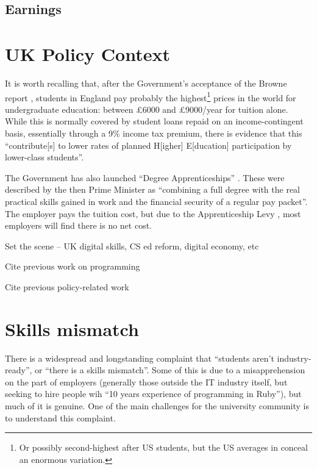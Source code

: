 \documentclass[sigconf]{acmart}
\begin{document}
\subsection{Earnings}

\section{UK Policy Context}
It is worth recalling that, after the Government's acceptance of the Browne report \cite{BIS2010a}, students in England pay probably the highest\footnote{Or possibly second-highest after US students, but the US averages in \cite[Table B5.1]{OECD2016a} conceal an enormous variation.} prices in the world for undergraduate education: between \pounds6000 and \pounds9000/year for tuition alone. While this is normally covered by student loans repaid on an income-contingent basis, essentially through a 9\% income tax premium, there is evidence \cite{CallenderMason2017a} that this ``contribute[s] to lower rates of planned H[igher] E[ducation] participation by lower-class students''.

The Government has also launched ``Degree Apprenticeships'' \cite{BIS2015a}. These were described by the then Prime Minister as ``combining a full degree with the real practical skills gained in work and the financial security of a regular pay packet''. The employer pays the tuition cost, but due to the Apprenticeship Levy \cite{HMRC2016a}, most employers will find there is no net cost.

Set the scene -- UK digital skills, CS ed reform, digital economy, etc

Cite previous work on programming~\cite{davenport-et-al:latice2016,murphy-et-al:programming2017,simon-et-al:sigcse2018}

Cite previous policy-related work~\cite{crick+sentance:2011,brown-et-al-sigcse2013,brown-et-al-toce2014,crick+moller-wipsce2015}

\section{Skills mismatch}
There is a widespread and longstanding complaint that ``students aren't industry-ready'', or ``there is a skills mismatch''. Some of this is due to a misapprehension on the part of employers (generally those outside the IT industry itself, but seeking to hire people wih ``10 years experience of programming in Ruby''), but much of it is genuine. One of the main challenges for the university community is to understand this complaint.
\end{document}
